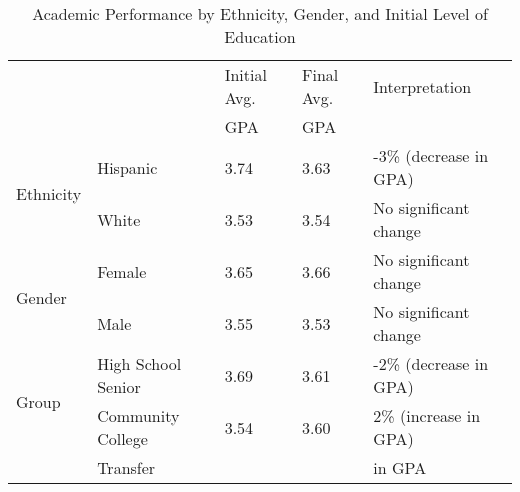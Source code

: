 \documentclass{article}
\begin{document}
\begin{table}[h]
\footnotesize%
\centering
\caption{Academic Performance by Ethnicity, Gender, and Initial Level of Education} 
\begin{tabular}{|l|l|l|l|l|}
  \hline
  \multicolumn{2}{|c|}{ } & Initial Avg. & Final Avg. & Interpretation \\
  \multicolumn{2}{|c|}{ } & GPA & GPA & \\
  \hline
  \multirow{2}{*}{Ethnicity} & Hispanic & 3.74 &	3.63 & -3\% (decrease in GPA) \\
  \cline{2-5}
  & White & 3.53  & 3.54 & No significant change \\
  \hline
  \multirow{2}{*}{Gender} & Female & 3.65	& 3.66	& No significant change \\
    \cline{2-5}
  & Male	& 3.55	& 3.53	& No significant change \\
  \hline
  \multirow{2}{*}{Group} & High School Senior & 3.69	& 3.61	& -2\% (decrease in GPA) \\
    \cline{2-5}
  & Community College & 3.54 & 3.60 & 2\% (increase in GPA) \\
  & Transfer & & & in GPA \\
  \hline
\end{tabular}
\end{table}
\end{document}
